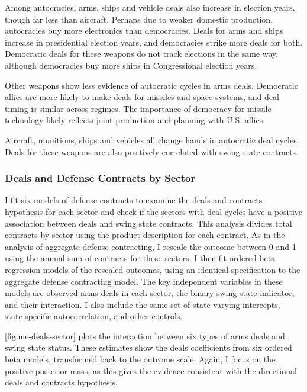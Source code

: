 \documentclass[12pt]{article}
\begin{document}
Among autocracies, arms, ships and vehicle deals also increase in election years, though far less than aircraft. 
Perhaps due to weaker domestic production, autocracies buy more electronics than democracies. 
Deals for arms and ships increase in presidential election years, and democracies strike more deals for both.  
Democratic deals for these weapons do not track elections in the same way, although democracies buy more ships in Congressional election years. 


Other weapons show less evidence of autocratic cycles in arms deals. 
Democratic allies are more likely to make deals for missiles and space systems, and deal timing is similar across regimes. 
The importance of democracy for missile technology likely reflects joint production and planning with U.S. allies. 


Aircraft, munitions, ships and vehicles all change hands in autocratic deal cycles. 
Deals for these weapons are also positively correlated with swing state contracts.  



\subsubsection{Deals and Defense Contracts by Sector}


I fit six models of defense contracts to examine the deals and contracts hypothesis for each sector and check if the sectors with deal cycles have a positive association between deals and swing state contracts. 
This analysis divides total contracts by sector using the product description for each contract. 
As in the analysis of aggregate defense contracting, I rescale the outcome between 0 and 1 using the annual sum of contracts for those sectors. 
I then fit ordered beta regression models of the rescaled outcomes, using an identical specification to the aggregate defense contracting model.
The key independent variables in these models are observed arms deals in each sector, the binary swing state indicator, and their interaction. 
I also include the same set of state varying intercepts, state-specific autocorrelation, and other controls. 


\autoref{fig:me-deals-sector} plots the interaction between six types of arms deals and swing state status.  
These estimates show the deals coefficients from six ordered beta models, transformed back to the outcome scale. 
Again, I focus on the positive posterior mass, as this gives the evidence consistent with the directional deals and contracts hypothesis.
\end{document}
